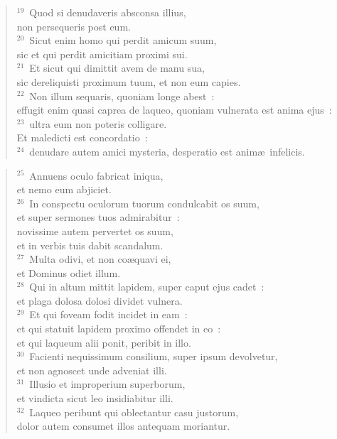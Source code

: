 \begin{verse}
${}^{19}$~Quod si denudaveris absconsa illius,\\ non persequeris post eum.\\
${}^{20}$~Sicut enim homo qui perdit amicum suum,\\ sic et qui perdit amicitiam proximi sui.\\
${}^{21}$~Et sicut qui dimittit avem de manu sua,\\ sic dereliquisti proximum tuum, et non eum capies.\\
${}^{22}$~Non illum sequaris, quoniam longe abest~:\\ effugit enim quasi caprea de laqueo, quoniam vulnerata est anima ejus~:\\
${}^{23}$~ultra eum non poteris colligare.\\ Et maledicti est concordatio~:\\
${}^{24}$~denudare autem amici mysteria, desperatio est anim\ae\ infelicis.\end{verse}


\begin{verse}${}^{25}$~Annuens oculo fabricat iniqua,\\ et nemo eum abjiciet.\\
${}^{26}$~In conspectu oculorum tuorum condulcabit os suum,\\ et super sermones tuos admirabitur~:\\ novissime autem pervertet os suum,\\ et in verbis tuis dabit scandalum.\\
${}^{27}$~Multa odivi, et non co\ae quavi ei,\\ et Dominus odiet illum.\\
${}^{28}$~Qui in altum mittit lapidem, super caput ejus cadet~:\\ et plaga dolosa dolosi dividet vulnera.\\
${}^{29}$~Et qui foveam fodit incidet in eam~:\\ et qui statuit lapidem proximo offendet in eo~:\\ et qui laqueum alii ponit, peribit in illo.\\
${}^{30}$~Facienti nequissimum consilium, super ipsum devolvetur,\\ et non agnoscet unde adveniat illi.\\
${}^{31}$~Illusio et improperium superborum,\\ et vindicta sicut leo insidiabitur illi.\\
${}^{32}$~Laqueo peribunt qui oblectantur casu justorum,\\ dolor autem consumet illos antequam moriantur.\end{verse}



